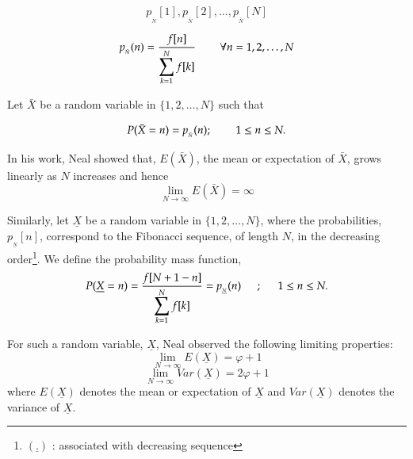 \begin{multicols}{2}
\vspace{-.6cm}

$$
p_{_{\bar{N}}}[1], p_{_{\bar{N}}}[2], \ldots, p_{_{\bar{N}}}[N]
$$

\vspace{-.2cm}

\begin{equation}
 p_{_{\bar{N}}}(n) = \frac{f[n]}{\displaystyle{\sum_{k =1}^N f[k]}} \hspace{0.3in} \forall n = 1, 2, \ldots, N \label{eq-2.3}
 \end{equation}

\vspace{-.2cm}

Let $\bar{X}$ be a random variable in $\{1,2, \ldots, N\}$ such that  

\vspace{-.2cm} 
 
\begin{equation}
P(\bar{X} = n) = p_{_{\bar{N}}}(n); \hspace{0.3in} 1 \leq n\leq N.\label{eq-2.4}
\end{equation}
 
\vspace{-.2cm} 
 
In his work, Neal \cite{art1-key01} showed that, $E(\bar{X})$, the mean or expectation of $\bar{X}$, grows linearly as $N$ increases and hence 
\begin{equation}
\lim_{N\rightarrow \infty} E(\bar{X}) = \infty\label{eq-2.5}
\end{equation} 

\vspace{-.4cm} 

Similarly, let $\underline{X}$ be a random variable in $\{1,2, \ldots, N\}$, where the probabilities, $p_{_{\underline{N}}}[n]$, correspond to the Fibonacci sequence, of length $N$, in the decreasing order\footnote{${(\underline{.})}$ : associated with decreasing sequence}. We define the probability mass function,
\begin{equation}
P(\underline{X} = n) = \frac{f[N+1-n]}{\displaystyle{\sum_{k =1}^N f[k]}} = p_{_{\underline{N}}}(n) \hspace{0.2in} ; \hspace{0.2in} 1 \leq n\leq N.\label{eq-2.6}
 \end{equation}

For such a random variable, $\underline{X}$, Neal \cite{art1-key01} observed the following limiting properties:
\begin{equation}
\lim_{N\rightarrow \infty} E(\underline{X}) = \varphi + 1\label{eq-2.7}
\end{equation}
\begin{equation}
\lim_{N\rightarrow \infty} Var(\underline{X}) = 2\varphi + 1\label{eq-2.8}
\end{equation}
where $E(\underline{X})$ denotes the mean or expectation of $\underline{X}$ and $Var(\underline{X})$ denotes the variance of $\underline{X}$.


\end{multicols}

